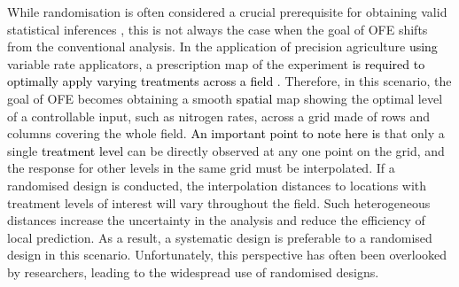 \documentclass[a4paper]{article} 	%
\newcommand{\revision}[1]{\textcolor{black}{#1}}
\newcommand{\zc}[1]{\textcolor{black}{#1}}
\begin{document}
While randomisation is often considered a crucial prerequisite for obtaining valid statistical inferences \parencite{Piepho2013Why}, this is not always the case when the goal of OFE shifts from the conventional analysis. In the application of precision agriculture \revision{using} variable rate applicators\revision{,} a prescription map of the experiment \revision{is required to optimally apply varying treatments across a field} \parencite{Pringle2004FieldScale}. Therefore, in this scenario, the goal of OFE becomes obtaining a smooth \revision{spatial} map showing the optimal level of a controllable input, such as nitrogen rates, across a grid made of rows and columns covering the whole field. \revision{An important point to note here is} that only a single \revision{treatment level} can be directly observed at any one point on the grid, and the response for other levels \zc{in} the same grid must be interpolated. If a randomised design is conducted, the interpolation distances to locations with treatment levels of interest will vary throughout the field. Such heterogeneous distances increase the uncertainty in the analysis and reduce the efficiency of local prediction. As a result, a systematic design is preferable to a randomised design in this scenario. Unfortunately, this perspective has often been overlooked by researchers, leading to the widespread use of randomised designs.
\end{document}
